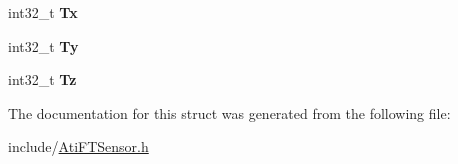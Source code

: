 \begin{DoxyCompactItemize}
int32\+\_\+t {\bfseries Tx}
\item 
\mbox{\label{structati__ft__sensor_1_1AtiFTSensor_1_1received__msg_a5569ea2c232fa28db4dece6c78f45f58}} 
int32\+\_\+t {\bfseries Ty}
\item 
\mbox{\label{structati__ft__sensor_1_1AtiFTSensor_1_1received__msg_a94fdb31f5268b90ecc2a50ebd57691f5}} 
int32\+\_\+t {\bfseries Tz}
\end{DoxyCompactItemize}


The documentation for this struct was generated from the following file\+:\begin{DoxyCompactItemize}
\item 
include/\hyperlink{AtiFTSensor_8h}{Ati\+F\+T\+Sensor.\+h}\end{DoxyCompactItemize}
